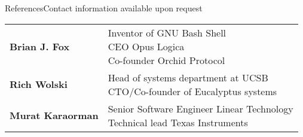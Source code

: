 \documentclass{resume} %
\begin{document}
\begin{rSectionSubTitle}{References}{Contact information available upon request}
  \begin{tabular}{ l l }
    {\bf Brian J. Fox} & \printReferenceHighlights{
      Inventor of GNU Bash Shell \\
      CEO Opus Logica \\
      Co-founder Orchid Protocol}

    \\

    {\bf Rich Wolski}
    &
    \printReferenceHighlights{
      Head of systems department at UCSB \\
      CTO/Co-founder of Eucalyptus systems}

    \\
    {\bf Murat Karaorman}
    &
    \printReferenceHighlights{
      Senior Software Engineer Linear Technology \\
      Technical lead Texas Instruments}

  \end{tabular}

\end{rSectionSubTitle}
\end{document}

